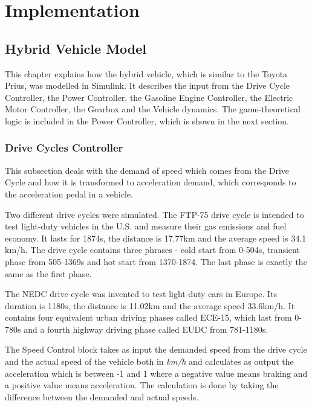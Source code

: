 \chapter{Implementation}
\label{chp:implementation}

\section{Hybrid Vehicle Model}
This chapter explains how the hybrid vehicle, which is similar to the Toyota Prius, was modelled in Simulink. It describes the input from the Drive Cycle Controller, the Power Controller, the Gasoline Engine Controller, the Electric Motor Controller, the Gearbox and the Vehicle dynamics. The game-theoretical logic is included in the Power Controller, which is shown in the next section.

\subsection{Drive Cycles Controller}
This subsection deals with the demand of speed which comes from the Drive Cycle and how it is transformed to acceleration demand, which corresponds to the acceleration pedal in a vehicle.

Two different drive cycles were simulated. The FTP-75 drive cycle is intended to test light-duty vehicles in the U.S. and measure their gas emissions and fuel economy. It lasts for 1874s, the distance is 17.77km and the average speed is 34.1 km/h. The drive cycle contains three phrases - cold start from 0-504s, transient phase from 505-1369s and hot start from 1370-1874. The last phase is exactly the same as the first phase.

The NEDC drive cycle was invented to test light-duty cars in Europe. Its duration is 1180s, the distance is 11.02km and  the average speed 33.6km/h. It contains four equivalent urban driving phases called ECE-15, which last from 0-780s and a fourth highway driving phase called EUDC from 781-1180s.

The Speed Control block takes as input the demanded speed from the drive cycle and the actual speed of the vehicle both in \textit{km/h} and calculates as output the acceleration which is between -1 and 1 where a negative value means braking and a positive value means acceleration. The calculation is done by taking the difference between the demanded and actual speeds.

